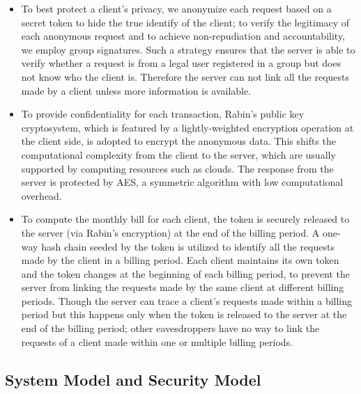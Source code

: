 \documentclass[letterpaper,12pt]{article}
\begin{document}
\begin{itemize}
\item To best protect a client's privacy,  we anonymize each request based on a secret token to hide the true identify of the client; to verify the legitimacy of each anonymous request and to achieve non-repudiation and accountability, we employ group signatures. Such a strategy ensures that the server is able to verify whether a request is from a legal user registered in a group but does not know who the client is. Therefore the server can not link all the requests made by a client unless more information is available.

\item To provide confidentiality for each transaction, Rabin's public key cryptosystem, which is featured by a lightly-weighted encryption operation at the client side, is adopted to encrypt the anonymous data. This shifts the computational complexity from the client to the server, which are usually supported by computing resources such as clouds. The response from the server is protected by AES, a symmetric algorithm with low computational overhead.

\item To compute the monthly bill for each client, the token is securely released to the server (via Rabin's encryption) at the end of the billing period. A one-way hash chain seeded by the token is utilized to identify all the requests made by the client in a billing period. Each client maintains its own token and the token changes at the beginning of each billing period, to prevent the server from linking the requests made by the same client at different billing periods. Though the server can trace a client's requests made within a billing period but this happens only when the token is released to the server at the end of the billing period; other eavesdroppers have no way to link the requests of a client made within one or multiple billing periods.

\end{itemize}




\subsection{System Model and Security Model} \label{sec:modelsDesignGoal}
\end{document}
